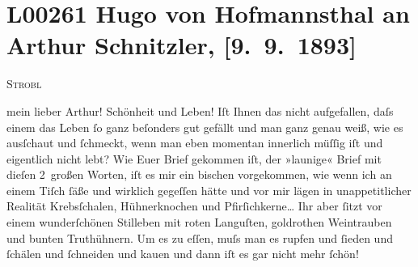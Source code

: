 

\section[Hugo von Hofmannsthal an Arthur Schnitzler, {[}9. 9. 1893{]}]{L00261 Hugo von Hofmannsthal an Arthur Schnitzler, {[}9. 9. 1893{]}}
\nopagebreak{}
\rehead{ }\normalsize\beginnumbering{}
\toendnotes[C]{\smallbreak\pagebreak[2]}
\toendnotes[C]{\smallbreak}
\pstart
           \raggedleft{}{\pb}\textsc{Strobl}\pend
           
\pstart{}mein lieber Arthur!\pend\vspace{0.5em}
\pstart
           Schönheit und Leben! Iſt Ihnen das nicht aufgefallen, daſs einem das Leben ſo ganz
               beſonders gut gefällt und man ganz genau weiß, wie es ausſchaut und ſchmeckt, wenn
               man eben momentan innerlich müſſig iſt und eigentlich nicht lebt? Wie Euer Brief gekommen iſt, der
               »launige« Brief mit dieſen 2 großen Worten, iſt es mir ein bischen vorgekommen, wie
               wenn ich an einem Tiſch ſäße und wirklich gegeſſen hätte und vor mir lägen in
               unappetitlicher Realität {\pb}Krebsſchalen, Hühnerknochen und Pfirſichkerne{\dots} Ihr aber
               ſitzt vor einem wunderſchönen Stilleben mit roten Languſten, goldrothen Weintrauben
               und bunten Truthühnern. Um es zu eſſen, muſs man es rupfen und ſieden und ſchälen und
               ſchneiden und kauen und dann iſt es gar nicht mehr ſchön!\pend
           
